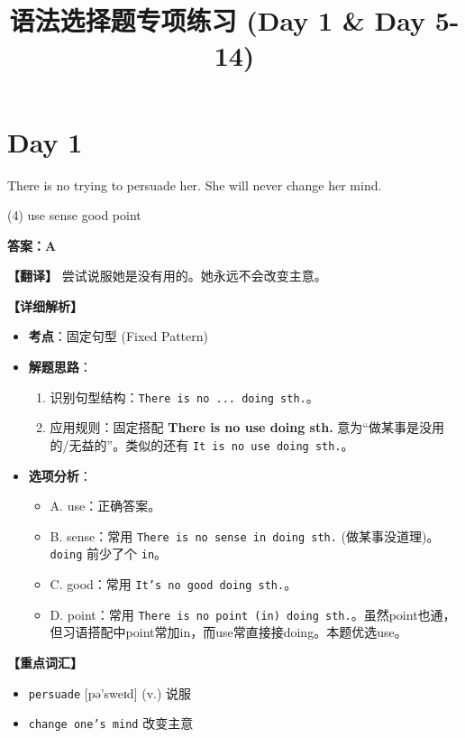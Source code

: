 \documentclass[11pt, a4paper]{article}
\title{\textbf{语法选择题专项练习 (Day 1 \& Day 5-14)}}
\date{}
\newcommand{\analysis}[4]{
    \begin{solutionbox}
        \textbf{答案：#1}
        
        \textbf{【翻译】} #2
        
        \textbf{【详细解析】}
        #3
        
        \textbf{【重点词汇】}
        #4
    \end{solutionbox}
}
\newcommand{\blank}{\underline{\hspace{1.5cm}}}
\begin{document}
\maketitle
\section*{Day 1}
\begin{questions}
    \item There is no \blank trying to persuade her. She will never change her mind.
    \begin{tasks}(4)
        \task use \task sense \task good \task point
    \end{tasks}
    \analysis{A}{尝试说服她是没有用的。她永远不会改变主意。}{
        \begin{itemize}
            \item \textbf{考点}：固定句型 (Fixed Pattern)
            \item \textbf{解题思路}：
                \begin{enumerate}
                    \item 识别句型结构：\texttt{There is no ... doing sth.}。
                    \item 应用规则：固定搭配 \textbf{There is no use doing sth.} 意为“做某事是没用的/无益的”。类似的还有 \texttt{It is no use doing sth.}。
                \end{enumerate}
            \item \textbf{选项分析}：
                \begin{itemize}
                    \item A. use：正确答案。
                    \item B. sense：常用 \texttt{There is no sense in doing sth.} (做某事没道理)。\texttt{doing} 前少了个 \texttt{in}。
                    \item C. good：常用 \texttt{It's no good doing sth.}。
                    \item D. point：常用 \texttt{There is no point (in) doing sth.}。虽然point也通，但习语搭配中point常加in，而use常直接接doing。本题优选use。
                \end{itemize}
        \end{itemize}
    }{
        \begin{itemize}
            \item \texttt{persuade} [pə'sweɪd] (v.) 说服
            \item \texttt{change one's mind} 改变主意
        \end{itemize}
    }


\end{questions}
\end{document}
